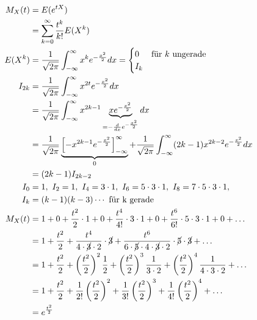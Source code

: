 \documentclass[10pt,a4paper]{scrartcl}
\begin{document}
\begin{align*}
    M_X(t) &= E(e^{tX}) \\
           &= \sum_{k=0}^\infty \frac{t^k}{k!} E(X^k) \\
    E(X^k) &= \frac{1}{\sqrt{2\pi}} \int_{-\infty}^\infty x^k e^{-\frac{x^2}{2}} dx = \begin{cases} 0 & \text{für } k \text{ ungerade} \\ I_k \end{cases} \\
    I_{2k} &= \frac{1}{\sqrt{2\pi}} \int_{-\infty}^\infty x^{2t} e^{-\frac{x^2}{2}} dx \\
           &= \frac{1}{\sqrt{2\pi}} \int_{-\infty}^\infty x^{2k-1} \underbrace{xe^{-\frac{x^2}{2}}}_{= -\frac{d}{dx} e^{-\frac{x^2}{2}}} dx \\
           &= \frac{1}{\sqrt{2\pi}} \underbrace{\left[ -x^{2k-1} e^{-\frac{x^2}{2}} \right]_{-\infty}^\infty}_0 + 
               \frac{1}{\sqrt{2\pi}} \int_{-\infty}^\infty (2k-1)x^{2k-2} e^{-\frac{x^2}{2}} dx\\
           &= (2k-1)I_{2k-2} \\
       I_0 &= 1,\  I_2 = 1,\  I_4 = 3\cdot 1,\  I_6 = 5\cdot 3\cdot 1,\  I_8 = 7\cdot 5\cdot 3\cdot 1,\\
       I_k &= (k-1)(k-3)\cdots \text{ für k gerade} \\
    M_X(t) &= 1 + 0 + \frac{t^2}{2} \cdot 1 + 0 + \frac{t^4}{4!} \cdot 3 \cdot 1 + 0 + \frac{t^6}{6!}\cdot 5 \cdot 3 \cdot 1 + 0 + \dots \\
           &= 1 + \frac{t^2}{2} + \frac{t^4}{4\cdot \cancel{3}\cdot2} \cdot \cancel{3} + 
               \frac{t^6}{6\cdot\cancel{5}\cdot4\cdot \cancel{3}\cdot2}\cdot \cancel{5} \cdot \cancel{3} + \dots \\
           &= 1 + \frac{t^2}{2} + \left(\frac{t^2}{2}\right)^2 \frac{1}{2} + \left(\frac{t^2}{2}\right)^3 \frac{1}{3\cdot2} + 
               \left(\frac{t^2}{2}\right)^4 \frac{1}{4\cdot3\cdot2} + \dots \\
           &= 1 + \frac{t^2}{2} + \frac{1}{2!} \left(\frac{t^2}{2}\right)^2 + \frac{1}{3!} \left(\frac{t^2}{2}\right)^3 + 
               \frac{1}{4!} \left(\frac{t^2}{2}\right)^4 + \dots \\
           &= e^{\frac{t^2}{2}}
\end{align*}
\end{document}
